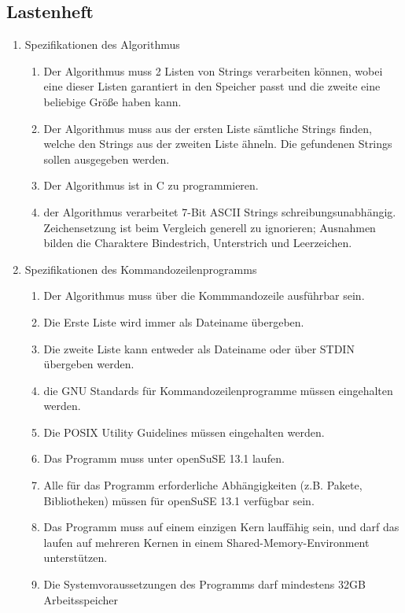 \subsection{Lastenheft}
\renewcommand{\labelenumii}{\theenumii}
\renewcommand{\theenumii}{\theenumi.\arabic{enumii}.}
\label{auszug:lastenheft}
\begin{enumerate}
	\item Spezifikationen des Algorithmus
	\begin{enumerate}
		\item Der Algorithmus muss 2 Listen von Strings verarbeiten können,
		wobei eine dieser Listen garantiert in den Speicher passt und die zweite
		eine beliebige Größe haben kann.
		\item Der Algorithmus muss aus der ersten Liste sämtliche Strings finden,
		welche den Strings aus der zweiten Liste ähneln. Die gefundenen Strings
		sollen ausgegeben werden.
		\item Der Algorithmus ist in C zu programmieren.
		\item der Algorithmus verarbeitet 7-Bit ASCII Strings schreibungsunabhängig. Zeichensetzung
		ist beim Vergleich generell zu ignorieren; Ausnahmen bilden die
		Charaktere Bindestrich, Unterstrich und Leerzeichen.
	\end{enumerate}
	\item Spezifikationen des Kommandozeilenprogramms
	\begin{enumerate}
		\item Der Algorithmus muss über die Kommmandozeile ausführbar sein.
		\item Die Erste Liste wird immer als Dateiname übergeben.
		\item Die zweite Liste kann entweder als Dateiname oder über STDIN übergeben werden.
		\item die GNU Standards für Kommandozeilenprogramme müssen eingehalten werden.
		\item Die POSIX Utility Guidelines müssen eingehalten werden.
		\item Das Programm muss unter openSuSE 13.1 laufen.
		\item Alle für das Programm erforderliche Abhängigkeiten
		(z.B. Pakete, Bibliotheken) müssen für openSuSE 13.1 verfügbar sein.
		\item Das Programm muss auf einem einzigen Kern lauffähig sein, und
		darf das laufen auf mehreren Kernen in einem Shared-Memory-Environment
		unterstützen.
		\item Die Systemvoraussetzungen des Programms darf mindestens 32GB Arbeitsspeicher

\end{enumerate}
\end{enumerate}
